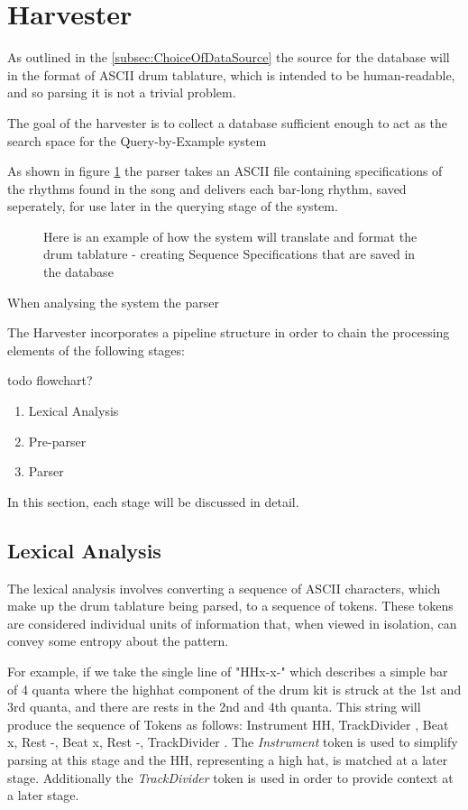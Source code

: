 \documentclass[12pt,twoside,notitlepage]{report}
\begin{document}
	
	\section{Harvester}\label{sec:Harvester}
	As outlined in the \ref{subsec:ChoiceOfDataSource} the source for the database will in the format of ASCII drum tablature, which is intended to be human-readable, and so parsing it is not a trivial problem. 
	
	The goal of the harvester is to collect a database sufficient enough to act as the search space for the Query-by-Example system
	
	As shown in figure \ref{exampleIdealParse} the parser takes an ASCII file containing specifications of the rhythms found in the song and delivers each bar-long rhythm, saved seperately, for use later in the querying stage of the system.
	

\begin{figure}[h]
			\caption{\label{exampleIdealParse} Here is an example of how the system will translate and format the drum tablature - creating Sequence Specifications that are saved in the database}
\end{figure}

		When analysing the system the parser

		The Harvester incorporates a pipeline structure in order to chain the processing elements of the following stages:
		
		todo flowchart?
		\begin{enumerate}
			\item{Lexical Analysis}
			\item{Pre-parser}
			\item{Parser}
		\end{enumerate}
		In this section, each stage will be discussed in detail.
		

		\subsection{Lexical Analysis}
				
		
		The lexical analysis involves converting a sequence of ASCII characters, which make up the drum tablature being parsed, to a sequence of tokens. These tokens are considered individual units of information that, when viewed in isolation, can convey some entropy about the pattern.
		
		For example, if we take the single line of "HH\textpipe x-x-\textpipe" which describes a simple bar of 4 quanta where the highhat component of the drum kit is struck at the 1st and 3rd quanta, and there are rests in the 2nd and 4th quanta. This string will produce the sequence of Tokens as follows: Instrument HH, TrackDivider \textpipe, Beat x, Rest -, Beat x, Rest -, TrackDivider \textpipe. The \emph{Instrument} token is used to simplify parsing at this stage and the HH, representing a high hat, is matched at a later stage. Additionally the \emph{TrackDivider} token is used in order to provide context at a later stage.
		
\end{document}
